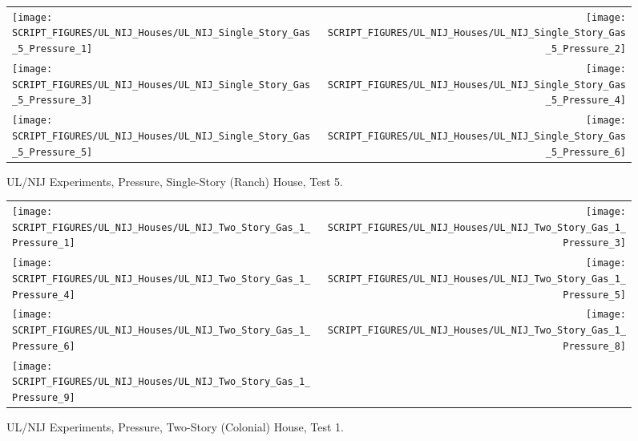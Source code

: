 \begin{figure}[p]
\begin{tabular*}{\textwidth}{l@{\extracolsep{\fill}}r}
\texttt{[image: SCRIPT\_FIGURES/UL\_NIJ\_Houses/UL\_NIJ\_Single\_Story\_Gas\_5\_Pressure\_1]} &
\texttt{[image: SCRIPT\_FIGURES/UL\_NIJ\_Houses/UL\_NIJ\_Single\_Story\_Gas\_5\_Pressure\_2]} \\
\texttt{[image: SCRIPT\_FIGURES/UL\_NIJ\_Houses/UL\_NIJ\_Single\_Story\_Gas\_5\_Pressure\_3]} &
\texttt{[image: SCRIPT\_FIGURES/UL\_NIJ\_Houses/UL\_NIJ\_Single\_Story\_Gas\_5\_Pressure\_4]} \\
\texttt{[image: SCRIPT\_FIGURES/UL\_NIJ\_Houses/UL\_NIJ\_Single\_Story\_Gas\_5\_Pressure\_5]} &
\texttt{[image: SCRIPT\_FIGURES/UL\_NIJ\_Houses/UL\_NIJ\_Single\_Story\_Gas\_5\_Pressure\_6]} \\
\end{tabular*}
\caption[UL/NIJ Experiments, Pressure, Single-Story (Ranch) House, Test 5]{UL/NIJ Experiments, Pressure, Single-Story (Ranch) House, Test 5.}
\label{UL_NIJ_Pres_Ranch_5}
\end{figure}

\begin{figure}[p]
\begin{tabular*}{\textwidth}{l@{\extracolsep{\fill}}r}
\texttt{[image: SCRIPT\_FIGURES/UL\_NIJ\_Houses/UL\_NIJ\_Two\_Story\_Gas\_1\_Pressure\_1]} &
\texttt{[image: SCRIPT\_FIGURES/UL\_NIJ\_Houses/UL\_NIJ\_Two\_Story\_Gas\_1\_Pressure\_3]} \\
\texttt{[image: SCRIPT\_FIGURES/UL\_NIJ\_Houses/UL\_NIJ\_Two\_Story\_Gas\_1\_Pressure\_4]} &
\texttt{[image: SCRIPT\_FIGURES/UL\_NIJ\_Houses/UL\_NIJ\_Two\_Story\_Gas\_1\_Pressure\_5]} \\
\texttt{[image: SCRIPT\_FIGURES/UL\_NIJ\_Houses/UL\_NIJ\_Two\_Story\_Gas\_1\_Pressure\_6]} &
\texttt{[image: SCRIPT\_FIGURES/UL\_NIJ\_Houses/UL\_NIJ\_Two\_Story\_Gas\_1\_Pressure\_8]} \\
\texttt{[image: SCRIPT\_FIGURES/UL\_NIJ\_Houses/UL\_NIJ\_Two\_Story\_Gas\_1\_Pressure\_9]}
\end{tabular*}
\caption[UL/NIJ Experiments, Pressure, Two-Story (Colonial) House, Test 1]{UL/NIJ Experiments, Pressure, Two-Story (Colonial) House, Test 1.}
\label{UL_NIJ_Pres_Colonial_1}
\end{figure}

